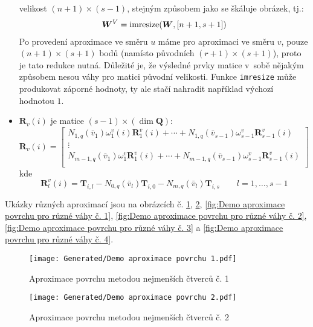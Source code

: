 \begin{itemize}
          velikost $(n+1) \times (s-1)$, stejným způsobem jako se škáluje obrázek, tj.:
          \begin{align}
              \bm{W}^V = \operatorname{imresize}(\bm{W}, [n + 1, s + 1])
          \end{align}
          Po provedení aproximace ve směru $u$ máme pro aproximaci ve směru $v$,
          pouze $(n+1)\times(s+1)$ bodů (namísto původních $(r+1)\times(s+1)$),
          proto je tato redukce nutná.
          Důležité je, že výsledné prvky matice v~sobě nějakým způsobem nesou
          váhy pro matici původní velikosti.
          Funkce \texttt{imresize} může produkovat záporné hodnoty,
          ty ale stačí nahradit například výchozí hodnotou $1$.
    \item $\bm{R}_v(i)$ je matice $(s - 1) \times(\dim\bm{Q})$:
          \begin{equation}
              \bm{R}_v(i) =
              \begin{bmatrix}
                  N_{1,q}(\bar{v}_1)\omega^v_1(i)\bm{R}^v_1(i) + \cdots + N_{1, q}(\bar{v}_{s - 1})\omega^v_{s-1}\bm{R}^v_{s - 1}(i) \\
                  \vdots                                                                                                             \\
                  N_{m-1,q}(\bar{v}_1)\omega^v_1\bm{R}^v_1(i) + \cdots + N_{m-1, q}(\bar{v}_{s - 1})\omega^v_{s-1}\bm{R}^v_{s- 1}(i) \\
              \end{bmatrix}
          \end{equation}
          kde
          \begin{equation}
              \bm{R}^v_l(i)  = \bm{T}_{i,l} - N_{0, q}(\bar{v}_l)\bm{T}_{i,0} - N_{m,q}(\bar{v}_l)\bm{T}_{i, s} \quad\quad l = 1, \ldots, s -1
          \end{equation}
\end{itemize}
Ukázky různých aproximací jsou na obrázcích č. \ref{fig:Demo aproximace povrchu č. 1},
\ref{fig:Demo aproximace povrchu č. 2},
\ref{fig:Demo aproximace povrchu pro různé váhy č. 1},
\ref{fig:Demo aproximace povrchu pro různé váhy č. 2},
\ref{fig:Demo aproximace povrchu pro různé váhy č. 3} a
\ref{fig:Demo aproximace povrchu pro různé váhy č. 4}.

\begin{imagepage}
    \begin{figure}[H]
        \centering
        \texttt{[image: Generated/Demo aproximace povrchu 1.pdf]}
        \caption{Aproximace povrchu metodou nejmenších čtverců č. 1}
        \label{fig:Demo aproximace povrchu č. 1}
    \end{figure}
    \begin{figure}[H]
        \centering
        \texttt{[image: Generated/Demo aproximace povrchu 2.pdf]}
        \caption{Aproximace povrchu metodou nejmenších čtverců č. 2}
        \label{fig:Demo aproximace povrchu č. 2}
    \end{figure}
\end{imagepage}

